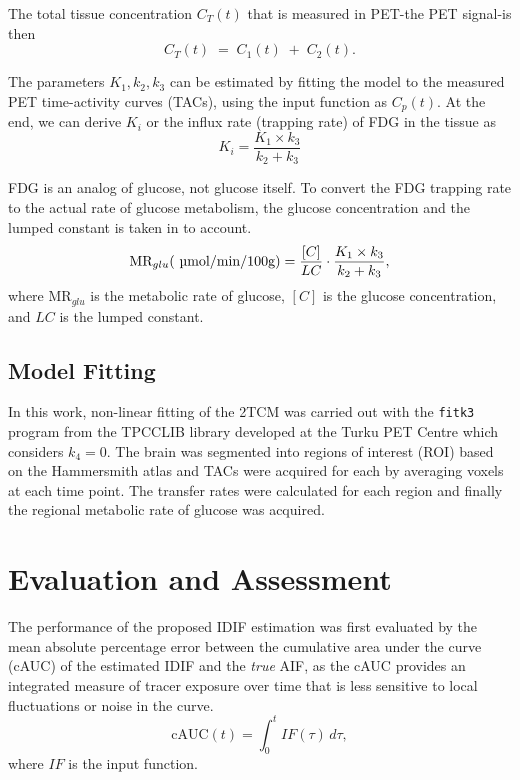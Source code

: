 The total tissue concentration \(C_T(t)\) that is measured in PET-the PET signal-is then
\begin{equation}
	C_T(t) \;=\; C_1(t) \;+\; C_2(t).
\end{equation}

The parameters \(K_1, k_2, k_3\) can be estimated by fitting the model to the measured PET time-activity curves (TACs), using the input function as \(C_p(t)\).
At the end, we can derive \(K_{i}\) or the influx rate (trapping rate) of FDG in the tissue as
\begin{equation}
	K_i = \frac{K_1 \times k_3}{k_2 + k_3}
\end{equation}

FDG is an analog of glucose, not glucose itself. To convert the FDG trapping rate to the actual rate of glucose metabolism, the glucose concentration and the lumped constant is taken in to account.
\begin{equation}
	\textrm{MR}_{glu} (\textrm{~\textmu mol/min/100g}) = \frac{[C]}{LC} \cdot \frac{K_1 \times k_3}{k_2 + k_3},
\end{equation}
where \(\textrm{MR}_{glu}\) is the metabolic rate of glucose, \([C]\) is the glucose concentration, and \(LC\) is the lumped constant. 

\subsection{Model Fitting}
In this work, non-linear fitting of the 2TCM was carried out with the \texttt{fitk3} program from the TPCCLIB library developed at the Turku PET Centre \cite{oikonen2018tpcclib} which considers \(k_4=0\).
The brain was segmented into regions of interest (ROI) based on the Hammersmith atlas \cite{TODO} and TACs were acquired for each by averaging voxels at each time point.
The transfer rates were calculated for each region and finally the regional metabolic rate of glucose was acquired.

\section{Evaluation and Assessment}
The performance of the proposed IDIF estimation was first evaluated by the mean absolute percentage error between the cumulative area under the curve (cAUC) of the estimated IDIF and the \textit{true} AIF, as the cAUC provides an integrated measure of tracer exposure over time that is less sensitive to local fluctuations or noise in the curve.
\begin{equation}
	\textrm{cAUC}(t) =  \int_{0}^{t} IF(\tau) \, d\tau,
\end{equation}
where \(IF\) is the input function.

